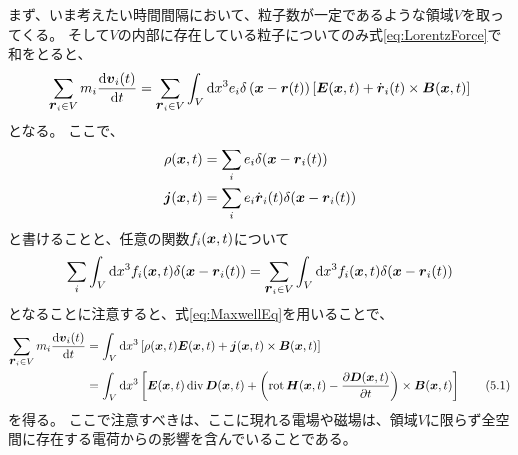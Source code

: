 \documentclass[a4paper]{jsarticle}
\def\vec#1{\mbox{\boldmath $#1$}}
\newcommand{\dif}[2]{\frac{{\rm d} #1}{{\rm d} #2}}
\newcommand{\pdif}[2]{\frac{\partial #1}{\partial #2}}
\newcommand{\ddif}{{\rm d}}
\DeclareMathOperator{\Div}{div}
\DeclareMathOperator{\Rot}{rot}
\begin{document}
まず、いま考えたい時間間隔において、粒子数が一定であるような領域$V$を取ってくる。
そして$V$の内部に存在している粒子についてのみ式\eqref{eq:LorentzForce}で和をとると、
\begin{align}
	\sum_{\vec{r}_i \in V} m_i \dif{\vec{v}_i(t)}{t}
	= \sum_{\vec{r}_i \in V} \int_V \ddif x^3 e_i
	\delta\left(\vec{x} - \vec{r}(t)\right) \left[
		\vec{E}(\vec{x}, t) + \dot{\vec{r}}_i(t) \times \vec{B}(\vec{x}, t)
	\right]
\end{align}
となる。
ここで、
\begin{align}
	\rho(\vec{x}, t) &= \sum_i e_i \delta(\vec{x} - \vec{r}_i(t)) \\
	\vec{j}(\vec{x}, t) &= \sum_i e_i \dot{\vec{r}}_i(t) \delta(\vec{x} - \vec{r}_i(t))
\end{align}
と書けることと、任意の関数$f_i(\vec{x}, t)$について
\begin{align}
	\sum_i \int_V \ddif x^3 f_i(\vec{x}, t) \delta(\vec{x} - \vec{r}_i(t))
	= \sum_{\vec{r}_i \in V} \int_V \ddif x^3 f_i(\vec{x}, t) \delta(\vec{x} - \vec{r}_i(t))
\end{align}
となることに注意すると、式\eqref{eq:MaxwellEq}を用いることで、
\begin{align}
	\sum_{\vec{r}_i \in V} m_i \dif{\vec{v}_i(t)}{t}
	&= \int_V \ddif x^3 \left[
		\rho(\vec{x}, t) \vec{E}(\vec{x}, t) + \vec{j}(\vec{x}, t) \times \vec{B}(\vec{x}, t)
	\right] \\
	&= \int_V \ddif x^3 \left[
		\vec{E}(\vec{x}, t) \Div \vec{D}(\vec{x}, t) + \left(
			\Rot \vec{H}(\vec{x}, t) - \pdif{\vec{D}(\vec{x}, t)}{t}
		\right) \times \vec{B}(\vec{x}, t)
	\right] \tag{5.1} \label{eq:5.1}
\end{align}
を得る。
ここで注意すべきは、ここに現れる電場や磁場は、領域$V$に限らず全空間に存在する電荷からの影響を含んでいることである。
\end{document}
